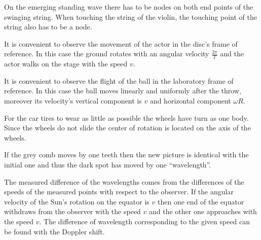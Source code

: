 \documentclass[11pt]{article}
\begin{document}

\hinteng
On the emerging standing wave there has to be nodes on both end points of the swinging string. When touching the string of the violin, the touching point of the string also has to be a node.
\probend
\bigskip


\hinteng
It is convenient to observe the movement of the actor in the disc’s frame of reference. In this case the ground rotates with an angular velocity $\frac{2\pi}{T}$ and the actor walks on the stage with the speed $v$.
\probend
\bigskip


\hinteng
It is convenient to observe the flight of the ball in the laboratory frame of reference. In this case the ball moves linearly and uniformly after the throw, moreover its velocity’s vertical component is $v$ and horizontal component $\omega R$.
\probend
\bigskip


\hinteng
For the car tires to wear as little as possible the wheels have turn as one body. Since the wheels do not slide the center of rotation is located on the axis of the wheels.
\probend
\bigskip


\hinteng
If the grey comb moves by one teeth then the new picture is identical with the initial one and thus the dark spot has moved by one “wavelength”.
\probend
\bigskip


\hinteng
The measured difference of the wavelengths comes from the differences of the speeds of the measured points with respect to the observer. If the angular velocity of the Sun’s rotation on the equator is $v$ then one end of the equator withdraws from the observer with the speed $v$ and the other one approaches with the speed $v$. The difference of wavelength corresponding to the given speed can be found with the Doppler shift.
\probend
\bigskip
\end{document}
